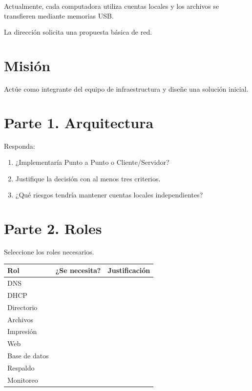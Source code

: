 \documentclass[
  spanish,
  letterpaper,
]{scrbook}
\newcounter{none} %
\providecommand{\tightlist}{%
  \setlength{\itemsep}{0pt}\setlength{\parskip}{0pt}}
\begin{document}
Actualmente, cada computadora utiliza cuentas locales y los archivos se
transfieren mediante memorias USB.

La dirección solicita una propuesta básica de red.

\section{Misión}\label{misiuxf3n}

Actúe como integrante del equipo de infraestructura y diseñe una
solución inicial.

\section{Parte 1. Arquitectura}\label{parte-1.-arquitectura}

Responda:

\begin{enumerate}
\def\labelenumi{\arabic{enumi}.}
\tightlist
\item
  ¿Implementaría Punto a Punto o Cliente/Servidor?
\item
  Justifique la decisión con al menos tres criterios.
\item
  ¿Qué riesgos tendría mantener cuentas locales independientes?
\end{enumerate}

\section{Parte 2. Roles}\label{parte-2.-roles}

Seleccione los roles necesarios.

{\def\LTcaptype{none} %
\begin{longtable}[]{@{}lll@{}}
\toprule\noalign{}
Rol & ¿Se necesita? & Justificación \\
\midrule\noalign{}
\endhead
\bottomrule\noalign{}
\endlastfoot
DNS & & \\
DHCP & & \\
Directorio & & \\
Archivos & & \\
Impresión & & \\
Web & & \\
Base de datos & & \\
Respaldo & & \\
Monitoreo & & \\
\end{longtable}
}
\end{document}
